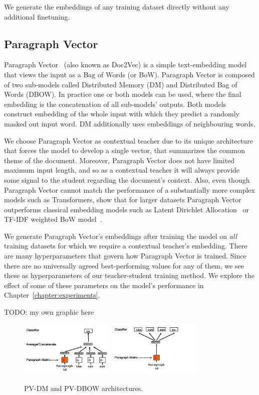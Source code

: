 We generate the embeddings of any training dataset directly without any
additional finetuning.

\subsection{Paragraph Vector}

Paragraph Vector~\cite{le2014distributed} (also known as Doc2Vec) is a simple
text-embedding model that views the input as a Bag of Words (or BoW). Paragraph
Vector is composed of two sub-models called Distributed Memory (DM) and
Distributed Bag of Words (DBOW). In practice one or both models can be used,
where the final embedding is the concatenation of all sub-models' outputs. Both
models construct embedding of the whole input with which they predict a
randomly masked out input word. DM additionally uses embeddings of neighbouring
words.

We choose Paragraph Vector as contextual teacher due to its unique architecture
that forces the model to develop a single vector, that summarizes the common
theme of the document. Moreover, Paragraph Vector does not have limited maximum
input length, and so as a contextual teacher it will always provide some signal
to the student regarding the document's context. Also, even though Paragraph
Vector cannot match the performance of a substantially more complex models such
as Transformers, \cite{dai2015document} show that for larger datasets Paragraph
Vector outperforms classical embedding models such as Latent Dirichlet
Allocation~\citep{blei2003latent} or TF-IDF weighted BoW
model~\citep{harris1954distributional}.

We generate Paragraph Vector's embeddings after training the model on
\emph{all} training datasets for which we require a contextual teacher's
embedding. There are many hyperparameters that govern how Paragraph Vector is
trained. Since there are no universally agreed best-performing values for any
of them, we see these as hyperparameters of our teacher-student training
method. We explore the effect of some of these parameters on the model's
performance in Chapter~\ref{chapter:experiments}.

TODO: my own graphic here

\begin{figure}[h]
    \centering
    \includegraphics[width=0.4\textwidth]{./img/pv-dm.png}
    \includegraphics[width=0.4\textwidth]{./img/pv-dbow.png}
    \caption{PV-DM and PV-DBOW architectures.\label{fig:pv-dm_pv-dbow}}
\end{figure}

